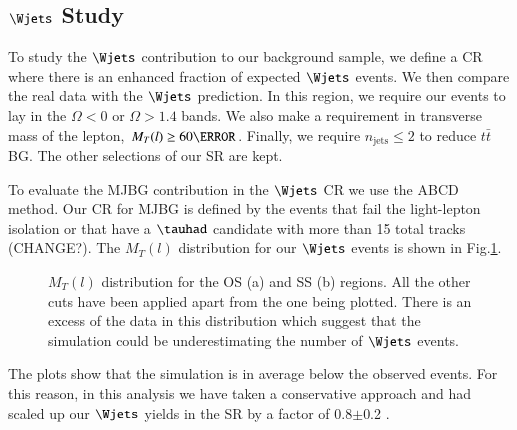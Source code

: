 \clearpage

\subsection{$\Wjets$ Study}\label{wjetsstudy}
To study the $\Wjets$ contribution to our background sample, we define a CR where there is an enhanced fraction of expected $\Wjets$ events. We then compare the real data with the  $\Wjets$ prediction. In this region, we require our events to lay in the $\Omega<0$ or $\Omega>1.4$ bands. We also make a requirement in transverse mass of the lepton, $M_T(l)\ge 60 \GeV$. Finally, we require $n_{\text{jets}}\le 2$ to reduce $t\bar{t}$ BG. The other selections of our SR are kept.

To evaluate the MJBG contribution in the $\Wjets$ CR we use the ABCD method. Our CR for MJBG is defined by the events that fail the light-lepton isolation or that have a $\tauhad$ candidate with more than 15 total tracks (CHANGE?). The  $M_T(l)$ distribution for our $\Wjets$ events is shown in Fig.\ref{Fig8}. 
\begin{figure}[htbp]
	\centering
	\hfill
	\caption{$M_T(l)$ distribution for the OS (a) and SS (b) regions. All the other cuts have been applied apart from the one being plotted. There is an excess of the data in this distribution which suggest that the simulation could be underestimating the number of $\Wjets$ events.}
	\label{Fig8}
\end{figure} 
The plots show that the simulation is in average below the observed events. For this reason, in this analysis we have taken a conservative approach and had scaled up our $\Wjets$ yields in the SR by a factor of 0.8$\pm$0.2 .
\clearpage
